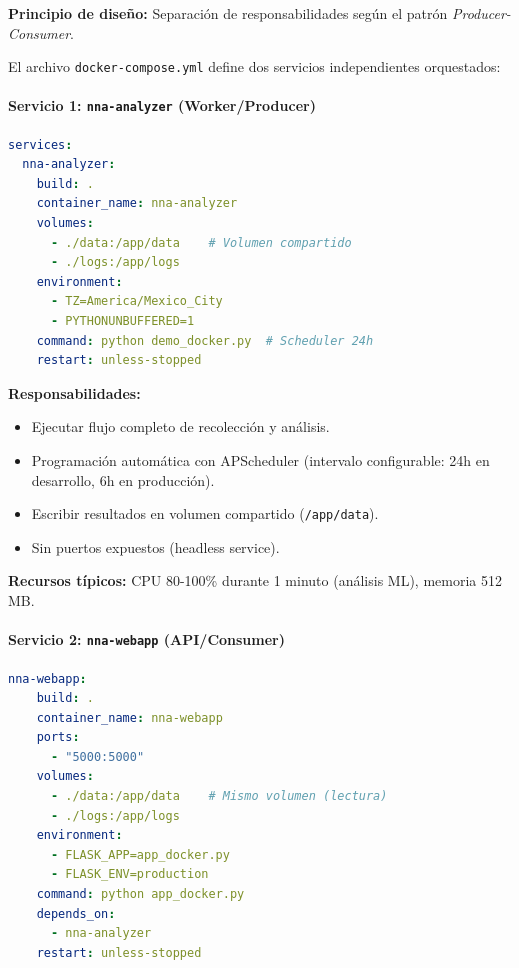 \textbf{Principio de diseño:} Separación de responsabilidades según el patrón \textit{Producer-Consumer}.

El archivo \texttt{docker-compose.yml} define dos servicios independientes orquestados:

\paragraph{Servicio 1: \texttt{nna-analyzer} (Worker/Producer)}

\begin{lstlisting}[language=yaml, caption={Configuración del servicio worker}]
services:
  nna-analyzer:
    build: .
    container_name: nna-analyzer
    volumes:
      - ./data:/app/data    # Volumen compartido
      - ./logs:/app/logs
    environment:
      - TZ=America/Mexico_City
      - PYTHONUNBUFFERED=1
    command: python demo_docker.py  # Scheduler 24h
    restart: unless-stopped
\end{lstlisting}

\textbf{Responsabilidades:}
\begin{itemize}
    \item Ejecutar flujo completo de recolección y análisis.
    \item Programación automática con APScheduler (intervalo configurable: 24h en desarrollo, 6h en producción).
    \item Escribir resultados en volumen compartido (\texttt{/app/data}).
    \item Sin puertos expuestos (headless service).
\end{itemize}

\textbf{Recursos típicos:} CPU 80-100\% durante 1 minuto (análisis ML), memoria 512 MB.

\paragraph{Servicio 2: \texttt{nna-webapp} (API/Consumer)}

\begin{lstlisting}[language=yaml, caption={Configuración del servicio web}]
  nna-webapp:
    build: .
    container_name: nna-webapp
    ports:
      - "5000:5000"
    volumes:
      - ./data:/app/data    # Mismo volumen (lectura)
      - ./logs:/app/logs
    environment:
      - FLASK_APP=app_docker.py
      - FLASK_ENV=production
    command: python app_docker.py
    depends_on:
      - nna-analyzer
    restart: unless-stopped
\end{lstlisting}


